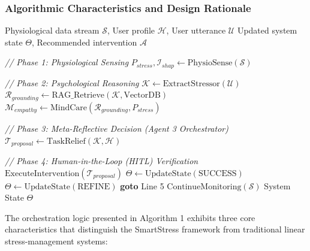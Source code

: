 \documentclass[journal,twoside,web]{ieeecolor}
\begin{document}
\subsubsection{Algorithmic Characteristics and Design Rationale}
\begin{algorithm}[h]
\caption{Meta-Reflective Orchestration for Closed-loop Stress Intervention}
\label{alg:orchestrator}
\begin{algorithmic}[1]
\REQUIRE Physiological data stream $\mathcal{S}$, User profile $\mathcal{H}$, User utterance $\mathcal{U}$
\ENSURE Updated system state $\Theta$, Recommended intervention $\mathcal{A}$

\STATE \textit{// Phase 1: Physiological Sensing}
\STATE $P_{stress}, \mathcal{I}_{shap} \leftarrow \text{PhysioSense}(\mathcal{S})$ 

    \STATE \textit{// Phase 2: Psychological Reasoning}
    \STATE $\mathcal{K} \leftarrow \text{ExtractStressor}(\mathcal{U})$ 
    \STATE $\mathcal{R}_{grounding} \leftarrow \text{RAG\_Retrieve}(\mathcal{K}, \text{VectorDB})$ 
    \STATE $\mathcal{M}_{empathy} \leftarrow \text{MindCare}(\mathcal{R}_{grounding}, P_{stress})$ 
    
    \STATE \textit{// Phase 3: Meta-Reflective Decision (Agent 3 Orchestrator)}
    \STATE $\mathcal{T}_{proposal} \leftarrow \text{TaskRelief}(\mathcal{K}, \mathcal{H})$ 
    
    \STATE \textit{// Phase 4: Human-in-the-Loop (HITL) Verification}
        \STATE $\text{ExecuteIntervention}(\mathcal{T}_{proposal})$
        \STATE $\Theta \leftarrow \text{UpdateState}(\text{SUCCESS})$
    \ELSE
        \STATE $\Theta \leftarrow \text{UpdateState}(\text{REFINE})$
        \STATE \textbf{goto} Line 5 
    \ENDIF
\ELSE
    \STATE $\text{ContinueMonitoring}(\mathcal{S})$
\ENDIF
\RETURN System State $\Theta$
\end{algorithmic}
\end{algorithm}

The orchestration logic presented in Algorithm 1 exhibits three core characteristics that distinguish the SmartStress framework from traditional linear stress-management systems:
\end{document}
